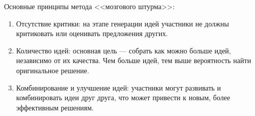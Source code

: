 Основные принципы метода <<мозгового штурма>>:

\begin{enumerate}
\item Отсутствие критики: на этапе генерации идей участники не должны критиковать или оценивать предложения других.

\item Количество идей: основная цель — собрать как можно больше идей, независимо от их качества. Чем больше идей, тем выше вероятность найти оригинальное решение.

\item Комбинирование и улучшение идей: участники могут развивать и комбинировать идеи друг друга, что может привести к новым, более эффективным решениям.
\end{enumerate}
